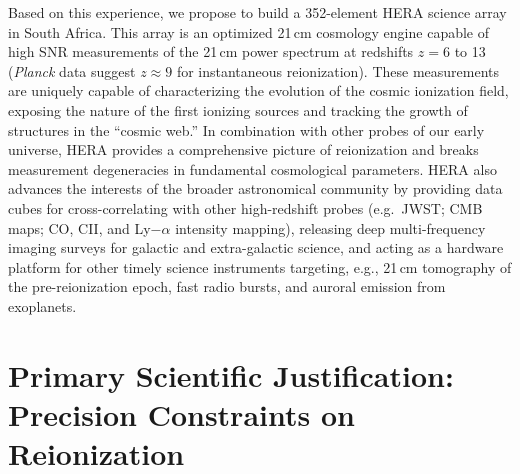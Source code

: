 \documentclass[preprint,11pt]{aastex}
\begin{document}
Based on this experience, we propose to build a 352-element
HERA science array in South Africa. This array is an optimized
21\,cm cosmology engine capable of high SNR measurements of
the 21\,cm power spectrum at
redshifts $z = 6$ to 13
(\emph{Planck} data suggest $z\approx 9$ for instantaneous reionization).  
These measurements are uniquely capable of characterizing
the evolution of the cosmic ionization field, exposing the nature of the first ionizing sources 
and tracking the growth  of structures in the ``cosmic web.'' In combination with other
probes of our early universe, HERA provides a comprehensive picture of reionization and breaks measurement degeneracies in 
fundamental cosmological parameters.  HERA also advances the interests of the broader astronomical community 
by providing data cubes for cross-correlating with other high-redshift probes (e.g.\ JWST; CMB maps; CO, CII, and Ly$-\alpha$ intensity mapping), %
releasing deep multi-frequency imaging surveys for galactic and extra-galactic science,
and acting as a hardware platform for other timely science instruments targeting, e.g., 21\,cm tomography of the pre-reionization epoch, fast radio bursts, and
auroral emission from exoplanets.


\vspace{-20pt}
\section{Primary Scientific Justification: Precision Constraints on Reionization}
\vspace{-5pt}


\end{document}
